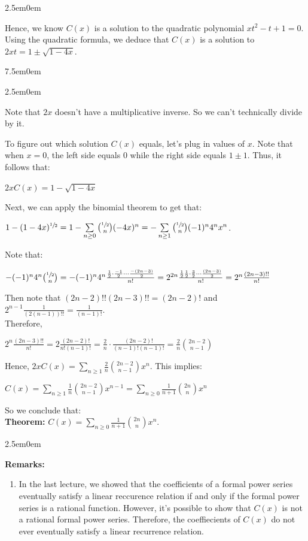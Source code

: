 \documentclass{book}
\newcommand{\teachComment}{
   \color{Orange}%
   \fontsize{12}{14}\selectfont%
}
\newenvironment{myIndent}{%
   \begin{adjustwidth}{2.5em}{0em}%
}{%
   \end{adjustwidth}%
}
\newenvironment{myTindent}{%
   \begin{adjustwidth}{7.5em}{0em}%
}{%
   \end{adjustwidth}%
}
\newcommand{\blab}[1]{\textbf{#1}}
\newcommand{\retTwo}{\hfill\bigbreak}
\begin{document}
\begin{myIndent}
   Hence, we know $C(x)$ is a solution to the quadratic polynomial $xt^2 - t + 1 = 0$. Using the quadratic formula, we deduce that $C(x)$ is a solution to $2xt = 1 \pm \sqrt{1 - 4x}$.

   \begin{myTindent}\begin{myIndent}\teachComment
      Note that $2x$ doesn't have a multiplicative inverse. So we can't technically divide by it.\retTwo
   \end{myIndent}\end{myTindent}

   To figure out which solution $C(x)$ equals, let's plug in values of $x$. Note that when $x = 0$, the left side equals $0$ while the right side equals $1 \pm 1$. Thus, it follows that:

   {\centering $2xC(x) = 1 - \sqrt{1 - 4x}$ \retTwo\par}

   Next, we can apply the binomial theorem to get that:
   
   {\centering $1 - (1 - 4x)^{\sfrac{1}{2}} = 1 - \sum\limits_{n \geq 0}\binom{\sfrac{1}{2}}{n} (-4x)^n = -\sum\limits_{n \geq 1}\binom{\sfrac{1}{2}}{n} (-1)^n4^nx^n$.\retTwo\par}

   Note that:

   {\centering $-(-1)^n4^n\binom{\sfrac{1}{2}}{n} = -(-1)^n4^n\frac{\frac{1}{2}\cdot\frac{-1}{2}\cdots\frac{-(2n - 3)}{2}}{n!} = 2^{2n}\frac{\frac{1}{2}\frac{1}{2}\cdot\frac{3}{2}\cdots\frac{(2n - 3)}{2}}{n!} = 2^n\frac{(2n-3)!!}{n!}$ \retTwo\par}

   Then note that $(2n - 2)!!(2n - 3)!! = (2n - 2)!$ and $2^{n-1}\frac{1}{(2(n-1))!!} = \frac{1}{(n-1)!}$.\\ Therefore,

   {\centering $2^n\frac{(2n-3)!!}{n!} = 2\frac{(2n-2)!}{n!(n-1)!} = \frac{2}{n} \cdot \frac{(2n-2)!}{(n-1)!(n-1)!} = \frac{2}{n}\binom{2n-2}{n-1}$ \retTwo\par}

   Hence, $2xC(x) = \sum\limits_{n \geq 1}\frac{2}{n}\binom{2n-2}{n-1}x^n$. This implies:

   {\centering $C(x) = \sum\limits_{n\geq 1}\frac{1}{n} \binom{2n-2}{n-1} x^{n-1} = \sum\limits_{n \geq 0}\frac{1}{n+1}\binom{2n}{n}x^{n}$ \retTwo\par}

   So we conclude that:\\
   \blab{Theorem:} $C(x) = \sum\limits_{n \geq 0}\frac{1}{n+1}\binom{2n}{n}x^n$.
   \begin{myIndent}\teachComment
      \blab{Remarks:}
      \begin{enumerate}
         \item In the last lecture, we showed that the coefficients of a formal power series eventually satisfy a linear reccurence relation if and only if the formal power series is a rational function. However, it's possible to show that  $C(x)$ is not a rational formal power series. Therefore, the coeffiecients of $C(x)$ do not ever eventually satisfy a linear recurrence relation.
         

\end{enumerate}
\end{myIndent}
\end{myIndent}
\end{document}
